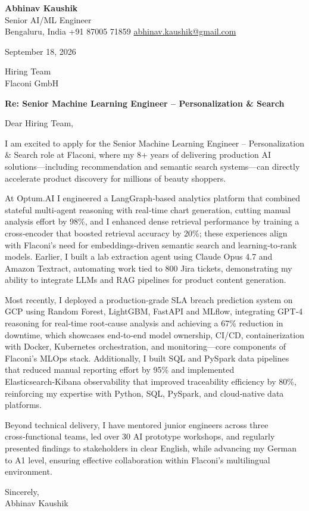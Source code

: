 \documentclass[11pt,a4paper]{article}
\begin{document}
{\Large\bfseries Abhinav Kaushik}\\
Senior AI/ML Engineer\\
Bengaluru, India \textbar{} +91 87005 71859 \textbar{} \href{mailto:abhinav.kaushik@gmail.com}{abhinav.kaushik@gmail.com}

September 18, 2026

Hiring Team\\
Flaconi GmbH

\textbf{Re: Senior Machine Learning Engineer – Personalization \& Search}

Dear Hiring Team,

I am excited to apply for the Senior Machine Learning Engineer – Personalization \& Search role at Flaconi, where my 8+ years of delivering production AI solutions—including recommendation and semantic search systems—can directly accelerate product discovery for millions of beauty shoppers.

At Optum.AI I engineered a LangGraph‑based analytics platform that combined stateful multi‑agent reasoning with real‑time chart generation, cutting manual analysis effort by 98\%, and I enhanced dense retrieval performance by training a cross‑encoder that boosted retrieval accuracy by 20\%; these experiences align with Flaconi’s need for embeddings‑driven semantic search and learning‑to‑rank models. Earlier, I built a lab extraction agent using Claude Opus 4.7 and Amazon Textract, automating work tied to 800 Jira tickets, demonstrating my ability to integrate LLMs and RAG pipelines for product content generation.

Most recently, I deployed a production‑grade SLA breach prediction system on GCP using Random Forest, LightGBM, FastAPI and MLflow, integrating GPT‑4 reasoning for real‑time root‑cause analysis and achieving a 67\% reduction in downtime, which showcases end‑to‑end model ownership, CI/CD, containerization with Docker, Kubernetes orchestration, and monitoring—core components of Flaconi’s MLOps stack. Additionally, I built SQL and PySpark data pipelines that reduced manual reporting effort by 95\% and implemented Elasticsearch‑Kibana observability that improved traceability efficiency by 80\%, reinforcing my expertise with Python, SQL, PySpark, and cloud‑native data platforms.

Beyond technical delivery, I have mentored junior engineers across three cross‑functional teams, led over 30 AI prototype workshops, and regularly presented findings to stakeholders in clear English, while advancing my German to A1 level, ensuring effective collaboration within Flaconi’s multilingual environment.

Sincerely,\\[4pt]
Abhinav Kaushik
\end{document}
